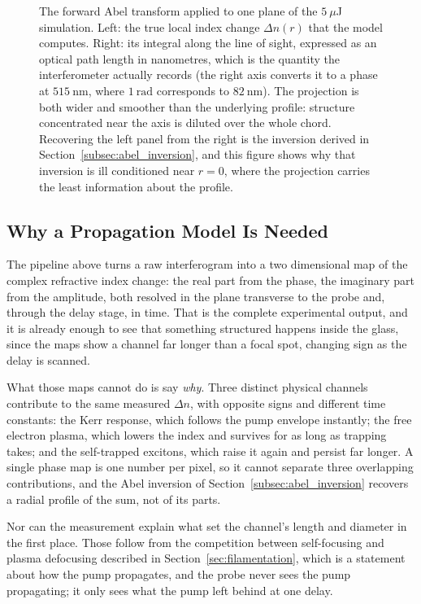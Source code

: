 \begin{figure}[htbp]
    \centering
    \caption{The forward Abel transform applied to one plane of the $5\ \mu$J simulation. Left: the true local index change $\Delta n(r)$ that the model computes. Right: its integral along the line of sight, expressed as an optical path length in nanometres, which is the quantity the interferometer actually records (the right axis converts it to a phase at $515\ \text{nm}$, where $1\ \text{rad}$ corresponds to $82\ \text{nm}$). The projection is both wider and smoother than the underlying profile: structure concentrated near the axis is diluted over the whole chord. Recovering the left panel from the right is the inversion derived in Section~\ref{subsec:abel_inversion}, and this figure shows why that inversion is ill conditioned near $r=0$, where the projection carries the least information about the profile.}
    \label{fig:rep_abel}
\end{figure}

\subsection{Why a Propagation Model Is Needed}

\label{sec:why_model}

The pipeline above turns a raw interferogram into a two dimensional map of the complex refractive index change: the real part from the phase, the imaginary part from the amplitude, both resolved in the plane transverse to the probe and, through the delay stage, in time. That is the complete experimental output, and it is already enough to see that something structured happens inside the glass, since the maps show a channel far longer than a focal spot, changing sign as the delay is scanned.

What those maps cannot do is say \emph{why}. Three distinct physical channels contribute to the same measured $\Delta n$, with opposite signs and different time constants: the Kerr response, which follows the pump envelope instantly; the free electron plasma, which lowers the index and survives for as long as trapping takes; and the self-trapped excitons, which raise it again and persist far longer. A single phase map is one number per pixel, so it cannot separate three overlapping contributions, and the Abel inversion of Section~\ref{subsec:abel_inversion} recovers a radial profile of the sum, not of its parts.

Nor can the measurement explain what set the channel's length and diameter in the first place. Those follow from the competition between self-focusing and plasma defocusing described in Section~\ref{sec:filamentation}, which is a statement about how the pump propagates, and the probe never sees the pump propagating; it only sees what the pump left behind at one delay.

